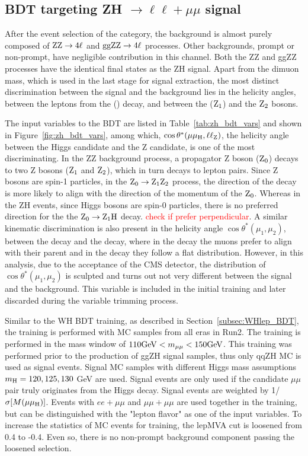 \subsection{BDT targeting \texorpdfstring{ZH $\to \ell\ell+\mu\mu$}{ZH to 4l} signal}\label{subsec:ZHlep_BDT}

After the event selection of the \ZH category, the background is almost purely composed of $\mathrm{Z}\mathrm{Z} \to 4\ell$ and $\mathrm{g}\mathrm{g}\mathrm{Z}\mathrm{Z} \to 4 \ell$ processes. 
Other backgrounds, prompt or non-prompt, have negligible contribution in this channel. 
Both the ZZ and ggZZ processes have the identical final states as the ZH signal. 
Apart from the dimuon mass, which is used in the last stage for 
signal extraction, the most distinct discrimination between the signal and the background 
lies in the helicity angles, between the leptons from the \PH (\PZ) decay, 
and between the \PH ($\mathrm{Z}_{1}$) and the $\mathrm{Z}_{2}$ bosons.

The input variables to the BDT are listed in Table~\ref{tab:zh_bdt_vars} and shown in Figure~\ref{fig:zh_bdt_vars}, 
among which, $\cos\theta^*(\mu\mu_{\mathrm{H}},\ell\ell_{\mathrm{Z}})$, the helicity angle between 
the Higgs candidate and the Z candidate, is one of the most discriminating. 
In the ZZ background process, a propagator Z boson ($\mathrm{Z}_{0}$) decays to two Z bosons ($\mathrm{Z}_{1}$ and $\mathrm{Z}_{2}$),
which in turn decays to lepton pairs. Since Z bosons are spin-1 particles, in the $\mathrm{Z}_{0} \to \mathrm{Z}_{1}\mathrm{Z}_{2}$ 
process, the direction of the decay is more likely to align with the direction of the momentum of the $\mathrm{Z}_{0}$.
Whereas in the ZH events, since Higgs bosons are spin-0 particles, there is no preferred direction for 
the the $\mathrm{Z}_{0} \to \mathrm{Z}_{1}\mathrm{H}$ decay. \textcolor{red}{check if prefer perpendicular}.
A similar kinematic discrimination is also present in the helicity angle $\cos\theta^*(\mu_{1}, \mu_{2})$, 
between the \zmm decay and the \hmm decay, 
where in the \PZ decay the muons prefer to align with their parent and in the \PH decay they follow a flat distribution. 
However, in this analysis, due to the acceptance of the CMS detector, 
the distribution of $\cos\theta^*(\mu_{1}, \mu_{2})$ is sculpted and turns out not very different between the signal and the background. 
This variable is included in the initial training and later discarded during the variable trimming process.

Similar to the WH BDT training, as described in Section~\ref{subsec:WHlep_BDT}, 
the training is performed with MC samples from all eras in Run2. The training is performed in the mass 
window of $110 \mbox{GeV}{} < m_{\mu\mu} < 150 \mbox{GeV}{}$.  This training was performed prior to the production
of ggZH signal samples, thus only qqZH MC is used as signal events. 
Signal MC samples with different Higgs mass assumptions $m_{\mathrm{H}} = 120, 125, 130$ GeV are used. 
Signal events are only used if the candidate $\mu\mu$ pair truly originates from the Higgs decay.  
Signal events are weighted by 1/$\sigma[M(\mu\mu_{\mathrm{H}})]$.
Events with $ee+\mu\mu$ and $\mu\mu+\mu\mu$ are used together in the training, 
but can be distinguished with the "lepton flavor" as one of the input variables.  
To increase the statistics of MC events for training, the lepMVA cut is loosened from 0.4 to -0.4.
Even so, there is no non-prompt background component passing the loosened selection.

